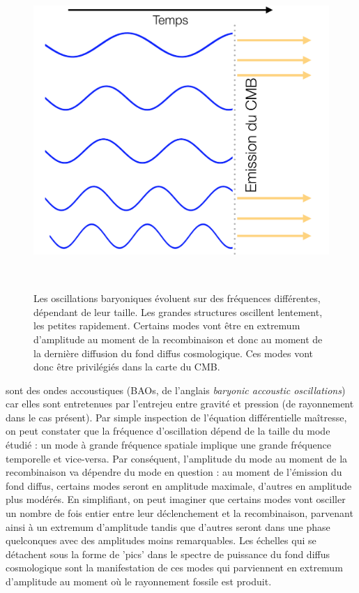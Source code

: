 \begin{figure}[htbp]
	\centering
		\includegraphics[height=12cm]{figs/bao1.png}
	\caption{Les oscillations baryoniques évoluent sur des fréquences différentes, dépendant de leur taille. Les grandes structures oscillent lentement, les petites rapidement. Certains modes vont être en extremum d'amplitude au moment de la recombinaison et donc au moment de la dernière diffusion du fond diffus cosmologique. Ces modes vont donc être privilégiés dans la carte du CMB.}
	\label{f:bao1}
\end{figure}


  sont des ondes accoustiques (BAOs, de l'anglais \textit{baryonic accoustic oscillations}) car elles sont entretenues par l'entrejeu entre gravité et pression (de rayonnement dans le cas présent). Par simple inspection de l'équation différentielle maîtresse, on peut constater que la fréquence d'oscillation dépend de la taille du mode étudié : un mode à grande fréquence spatiale implique une grande fréquence temporelle et vice-versa. Par conséquent, l'amplitude du mode au moment de la recombinaison va dépendre du mode en question : au moment de l'émission du fond diffus, certains modes seront en amplitude maximale, d'autres en amplitude plus modérés. En simplifiant, on peut imaginer que certains modes vont osciller un nombre de fois entier entre leur déclenchement et la recombinaison, parvenant ainsi à un extremum d'amplitude tandis que d'autres seront dans une phase quelconques avec des amplitudes moins remarquables. Les échelles qui se détachent sous la forme de 'pics' dans le spectre de puissance du fond diffus cosmologique sont la manifestation de ces modes qui parviennent en extremum d'amplitude au moment où le rayonnement fossile est produit.



